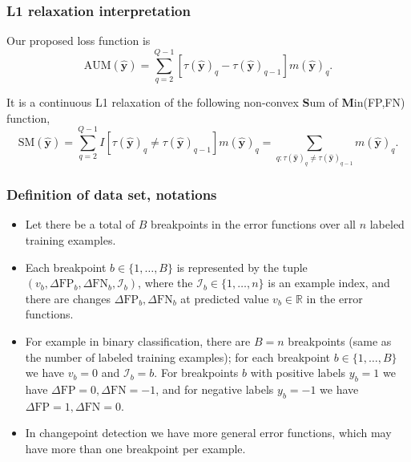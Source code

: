 \documentclass[t]{beamer}
\begin{document}
\begin{frame}
  \frametitle{L1 relaxation interpretation}
  
Our proposed loss function is
\begin{equation*}
\label{eq:AUM-computation}
    \text{AUM}(\mathbf {\hat y}) =
    \sum_{q=2}^{Q-1}
    [ \tau(\mathbf {\hat y})_{q} - \tau(\mathbf {\hat y})_{q-1} ]
    m(\mathbf {\hat y})_q.
\end{equation*}

It is a continuous L1 relaxation of the following non-convex \textbf{S}um of \textbf{M}in(FP,FN) function, 
\begin{equation*}
\label{eq:SM-computation}
    \text{SM}(\mathbf {\hat y}) =
    \sum_{q=2}^{Q-1}
    I[ \tau(\mathbf {\hat y})_{q} \neq \tau(\mathbf {\hat y})_{q-1} ]
    m(\mathbf {\hat y})_q =
    \sum_{q:\tau(\mathbf {\hat y})_{q} \neq \tau(\mathbf {\hat y})_{q-1} }
    m(\mathbf {\hat y})_q.
\end{equation*}

\end{frame}

\begin{frame}
  \frametitle{Definition of data set, notations}

  \begin{itemize}
  \item Let there be a total of $B$ breakpoints in the error functions over
    all $n$ labeled training examples.
  \item Each breakpoint
  $b\in\{1,\dots, B\}$ is represented by the tuple
  $(v_b, \Delta\text{FP}_b, \Delta\text{FN}_b, \mathcal I_b)$, where the
  $\mathcal I_b\in\{1,\dots,n\}$ is an example index, and there are
  changes $\Delta\text{FP}_b, \Delta\text{FN}_b$ at predicted value
  $v_b\in\mathbb R$ in the error functions.
\item For example in binary
  classification, there are $B=n$ breakpoints (same as the number of
  labeled training examples); for each breakpoint $b\in\{1,\dots,B\}$
  we have $v_b=0$ and $\mathcal I_b=b$.  For breakpoints $b$ with
  positive labels $y_b=1$ we have
  $\Delta\text{FP}=0,\Delta\text{FN}=-1$, and for negative labels
  $y_b=-1$ we have $\Delta\text{FP}=1,\Delta\text{FN}=0$.  
\item   In
  changepoint detection we have more general error functions, which
  may have more than one breakpoint per example.
  \end{itemize}
  
\end{frame}
\end{document}

